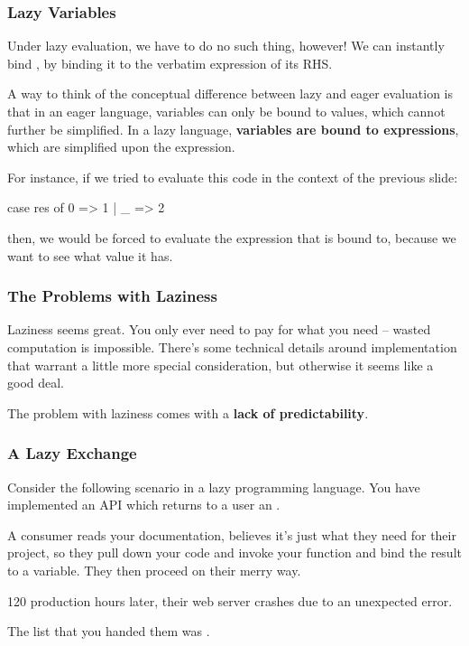 \documentclass[aspectratio=169, handout]{beamer}
\begin{document}
\begin{frame}[fragile]
  \frametitle{Lazy Variables}

  Under lazy evaluation, we have to do no such thing, however! We can instantly
  bind , by binding it to the verbatim expression of its RHS.

  \pause
  \vspace{\fill}

  A way to think of the conceptual difference between lazy and eager evaluation
  is that in an eager language, variables can only be bound to values, which
  cannot further be simplified. In a lazy language, \textbf{variables are bound to
  expressions}, which are simplified upon  the expression.

  \pause
  \vspace{\fill}

  For instance, if we tried to evaluate this code in the context of the previous
  slide:
  \begin{codeblock}
    case res of
      0 => 1
    | _ => 2
  \end{codeblock}
  then, we would be forced to evaluate the expression that  is bound
  to, because we want to see what value it has.
\end{frame}

\begin{frame}[fragile]
  \frametitle{The Problems with Laziness}

  Laziness seems great. You only ever need to pay for what you need --
  wasted computation is impossible. There's some technical details around
  implementation that warrant a little more special consideration, but otherwise
  it seems like a good deal.

  \pause
  \vspace{\fill}

  The problem with laziness comes with a \textbf{lack of predictability}.
\end{frame}

\begin{frame}[fragile]
  \frametitle{A Lazy Exchange}

  Consider the following scenario in a lazy programming language. You have
  implemented an API which returns to a user an .

  \pause
  \vspace{\fill}

  A consumer reads your documentation, believes it's just what they need for
  their project, so they pull down your code and invoke your function and
  bind the result to a variable. They then proceed on their merry way.

  \pause
  \vspace{\fill}

  120 production hours later, their web server crashes due to an unexpected
  error.

  \pause
  \vspace{\fill}

  The list that you handed them was .
\end{frame}
\end{document}
